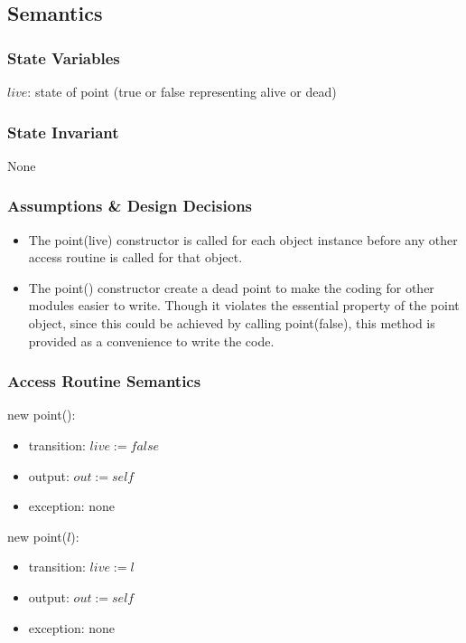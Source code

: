 \documentclass[12pt]{article}
\begin{document}
\subsection* {Semantics}

\subsubsection* {State Variables}

$live$: state of point (true or false representing alive or dead)

\subsubsection* {State Invariant}

None

\subsubsection* {Assumptions \& Design Decisions}

\begin{itemize}
\item The point(live) constructor is called for each object instance before any
  other access routine is called for that object.  
\item The point() constructor create a dead point to make the coding for other 
  modules easier to write. Though it violates the essential property of the point
  object, since this could be achieved by calling point(false), this
  method is provided as a convenience to write the code. 

\end{itemize}

\subsubsection* {Access Routine Semantics}

new point():
\begin{itemize}
\item transition: $live := false$

\item output: $\mathit{out} := \mathit{self}$
\item exception: none
\end{itemize}

\noindent new point($l$):
\begin{itemize}
\item transition: $live := l$

\item output: $\mathit{out} := \mathit{self}$
\item exception: none
\end{itemize}
\end{document}
